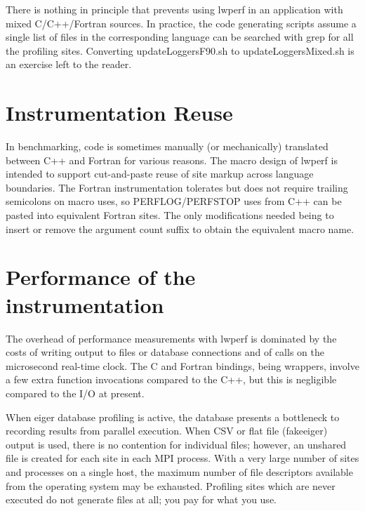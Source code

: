\documentclass{article}
\begin{document}
There is nothing in principle that prevents using lwperf in an application with mixed C/C++/Fortran sources.
In practice, the code generating scripts assume a single list of files in the corresponding language can
be searched with grep for all the profiling sites. Converting updateLoggersF90.sh to updateLoggersMixed.sh
is an exercise left to the reader.

\section{Instrumentation Reuse}
\label{sec:reuse}
In benchmarking, code is sometimes manually (or mechanically) translated 
between C++ and Fortran for various reasons. The macro design of lwperf
is intended to support cut-and-paste reuse of site markup 
across language boundaries. The Fortran instrumentation tolerates but
does not require trailing semicolons on macro uses, so PERFLOG/PERFSTOP uses
from C++ can be pasted into equivalent Fortran sites. The only modifications
needed being to insert or remove the argument count suffix to obtain the equivalent macro name.

\section{Performance of the instrumentation}
The overhead of performance measurements with lwperf is dominated by the costs of writing output to files or database connections and of calls on the microsecond real-time clock.
The C and Fortran bindings, being wrappers, involve a few extra function invocations compared to the C++, but this is negligible compared to the I/O at present.

When eiger database profiling is active, the database presents a bottleneck to recording results from parallel execution. When CSV or flat file (fakeeiger) output is used, there is no contention for individual files; however, an unshared file is created for each site in each MPI process. With a very large number of sites and processes on a single host, the maximum number of file descriptors available from the operating system may be exhausted. Profiling sites which are never executed do not generate files at all; you pay for what you use.
\end{document}
